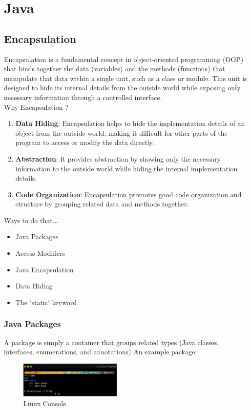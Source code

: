 \documentclass{book}
\begin{document}
\chapter{Java}
\section{Encapsulation}
Encapsulation is a fundamental concept in object-oriented programming (OOP) that binds together the data (variables) and the methods (functions)
that manipulate that data within a single unit, such as a class or module. This unit is designed to hide its internal details from the outside
world while exposing only necessary information through a controlled interface.\\
Why Encapsulation ?
\begin{enumerate}
	\item \textbf{Data Hiding}: Encapsulation helps to hide the implementation details of an object from the outside world, making it difficult for other parts of the program to access or modify the data directly.

	\item \textbf{Abstraction}: It provides abstraction by showing only the necessary information to the outside world while hiding the internal implementation details.

	\item \textbf{Code Organization}: Encapsulation promotes good code organization and structure by grouping related data and methods together.
\end{enumerate}
Ways to do that...
\begin{itemize}
	\item Java Packages
	\item Access Modifiers
	\item Java Encapsulation
	\item Data Hiding
	\item The `static` keyword
\end{itemize}
\subsection{Java Packages}
A package is simply a container that groups related types (Java classes, interfaces, enumerations, and annotations)
An example package:
\begin{figure}
	\centering
	\includegraphics[width=0.45\textwidth]{../pngs/package.png}
	\caption{Linux Console}
\end{figure}
\end{document}
